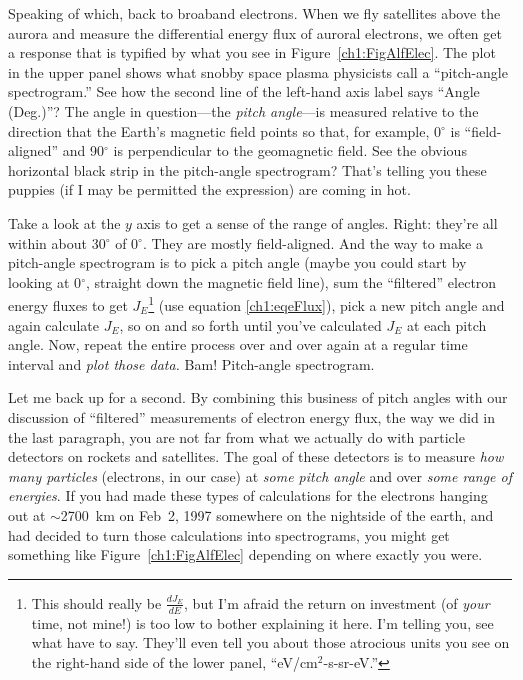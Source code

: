 
Speaking of which, back to broaband electrons. When we fly satellites
above the aurora and measure the differential energy flux of auroral
electrons, we often get a response that is typified by what you see in
Figure~\ref{ch1:FigAlfElec}. The plot in the upper panel shows what
snobby space plasma physicists call a ``pitch-angle spectrogram.''
See how the second line of the left-hand axis label says ``Angle
(Deg.)''?  The angle in question---the \emph{pitch angle}---is
measured relative to the direction that the Earth's magnetic field
points so that, for example, 0$^\circ$ is ``field-aligned'' and
90$^\circ$ is perpendicular to the geomagnetic field. See the obvious
horizontal black strip in the pitch-angle spectrogram? That's telling
you these puppies (if I may be permitted the expression) are coming in
hot.

Take a look at the $y$ axis to get a sense of the range of
angles. Right: they're all within about 30$^\circ$ of 0$^\circ$. They
are mostly field-aligned. And the way to make a pitch-angle
spectrogram is to pick a pitch angle (maybe you could start by looking
at 0$^\circ$, straight down the magnetic field line), sum the
``filtered'' electron energy fluxes to get $J_E$\footnote{This should
  really be $\frac{dJ_E}{dE}$, but I'm afraid the return on investment
  (of \emph{your} time, not mine!) is too low to bother explaining it
  here. I'm telling you, see what \citet{Bruno2013} have to
  say. They'll even tell you about those atrocious units you see on
  the right-hand side of the lower panel, ``eV/cm$^2$-s-sr-eV.''} (use
equation \ref{ch1:eqeFlux}), pick a new pitch angle and again
calculate $J_E$, so on and so forth until you've calculated $J_E$ at
each pitch angle. Now, repeat the entire process over and over again
at a regular time interval and \emph{plot those data.} Bam!
Pitch-angle spectrogram.

Let me back up for a second. By combining this business of pitch
angles with our discussion of ``filtered'' measurements of electron
energy flux, the way we did in the last paragraph, you are not far
from what we actually do with particle detectors on rockets and
satellites. The goal of these detectors is to measure \emph{how many
  particles} (electrons, in our case) at \emph{some pitch angle} and
over \emph{some range of energies}. If you had made these types of
calculations for the electrons hanging out at $\sim$2700~km on Feb~2,
1997 somewhere on the nightside of the earth, and had decided to turn
those calculations into spectrograms, you might get something like
Figure~\ref{ch1:FigAlfElec} depending on where exactly you were.


